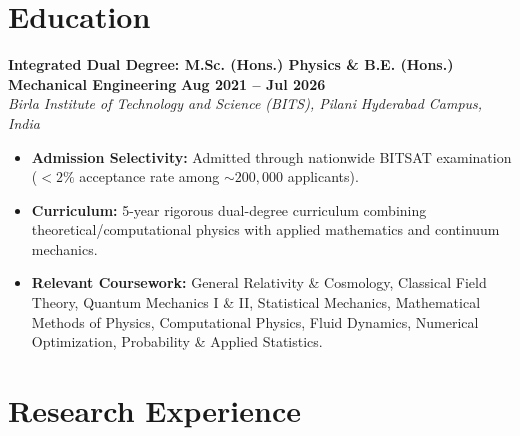 \documentclass[10pt,a4paper]{article}
\newcommand{\entryheader}[4]{%
    \noindent\textbf{#1} \hfill {\color{secondaryslate}\footnotesize\textbf{#2}}\\%
    \noindent\textit{#3} \hfill {\color{secondaryslate}\footnotesize\textit{#4}}\vspace{1.5pt}%
}
\begin{document}
\section{Education}

\entryheader{Integrated Dual Degree: M.Sc. (Hons.) Physics \& B.E. (Hons.) Mechanical Engineering}{Aug 2021 -- Jul 2026}{Birla Institute of Technology and Science (BITS), Pilani}{Hyderabad Campus, India}
\begin{itemize}
    \item \textbf{Admission Selectivity:} Admitted through nationwide BITSAT examination ($<2\%$ acceptance rate among $\sim 200{,}000$ applicants).
    \item \textbf{Curriculum:} 5-year rigorous dual-degree curriculum combining theoretical/computational physics with applied mathematics and continuum mechanics.
    \item \textbf{Relevant Coursework:} General Relativity \& Cosmology, Classical Field Theory, Quantum Mechanics I \& II, Statistical Mechanics, Mathematical Methods of Physics, Computational Physics, Fluid Dynamics, Numerical Optimization, Probability \& Applied Statistics.
\end{itemize}

\section{Research Experience}
\end{document}
